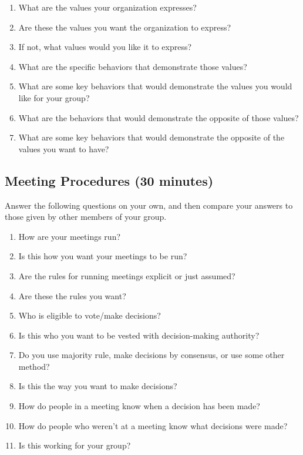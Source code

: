 \documentclass[10pt,statementpaper]{memoir}
\providecommand{\tightlist}{%
  \setlength{\itemsep}{0pt}\setlength{\parskip}{0pt}}
\begin{document}
\begin{enumerate}
\def\labelenumi{\arabic{enumi}.}
\tightlist
\item
  What are the values your organization expresses?
\item
  Are these the values you want the organization to express?
\item
  If not, what values would you like it to express?
\item
  What are the specific behaviors that demonstrate those values?
\item
  What are some key behaviors that would demonstrate the values you
  would like for your group?
\item
  What are the behaviors that would demonstrate the opposite of those
  values?
\item
  What are some key behaviors that would demonstrate the opposite of the
  values you want to have?
\end{enumerate}

\subsection*{Meeting Procedures (30
minutes)}\label{meeting-procedures-30-minutes}

Answer the following questions on your own, and then compare your
answers to those given by other members of your group.

\begin{enumerate}
\def\labelenumi{\arabic{enumi}.}
\tightlist
\item
  How are your meetings run?
\item
  Is this how you want your meetings to be run?
\item
  Are the rules for running meetings explicit or just assumed?
\item
  Are these the rules you want?
\item
  Who is eligible to vote/make decisions?
\item
  Is this who you want to be vested with decision-making authority?
\item
  Do you use majority rule, make decisions by consensus, or use some
  other method?
\item
  Is this the way you want to make decisions?
\item
  How do people in a meeting know when a decision has been made?
\item
  How do people who weren't at a meeting know what decisions were made?
\item
  Is this working for your group?
\end{enumerate}
\end{document}
